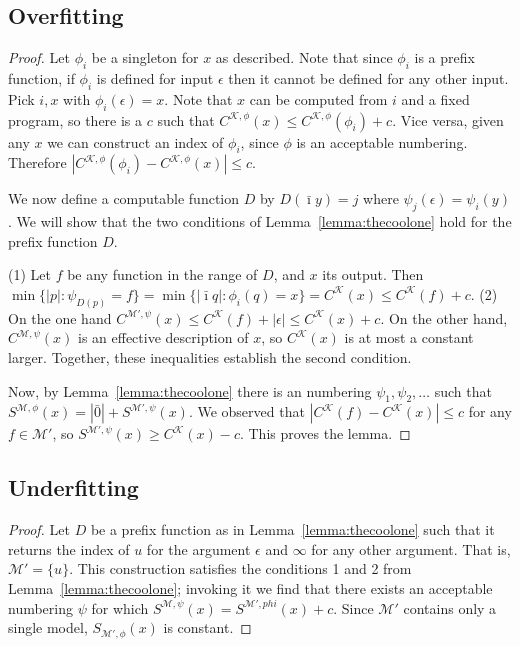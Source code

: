 \documentclass{style/llncs}
\newcommand{\M}{\mathscr M}
\newcommand{\K}{\mathscr K}
\newcommand{\s}{S}
\begin{document}
\subsection{Overfitting}

\overfitting*

\begin{proof}
Let $\phi_i$ be a singleton for $x$ as described. Note that since $\phi_i$ is a prefix function, if $\phi_i$ is defined for input $\epsilon$ then it cannot be defined for any other input. Pick $i,x$ with $\phi_i(\epsilon)=x$. Note that $x$ can be computed from $i$ and a fixed program, so there is a $c$ such that $C^{\K, \phi}(x)\le C^{\K, \phi}(\phi_i)+c$. Vice versa, given any $x$ we can construct an index of $\phi_i$, since $\phi$ is an acceptable numbering. Therefore $|C^{\K,\phi}(\phi_i)-C^{\K, \phi}(x)|\le c$.

We now define a computable function $D$ by $D(\bar\imath y)=j$ where $\psi_j(\epsilon) = \psi_i(y)$.  We will show that the two conditions of Lemma~\ref{lemma:thecoolone} hold for the prefix function $D$.

(1) Let $f$ be any function in the range of $D$, and $x$ its output. Then $\min\{|p|:\psi_{D(p)}=f\}=\min\{|\bar\imath q|:\phi_i(q)=x\}=C^{\K}(x) \le C^{\K}(f)+c$. (2) On the one hand $C^{\M',\psi}(x)\le C^\K(f)+|\epsilon|\le C^\K(x)+c$. On the other hand, $C^{\M,\psi}(x)$ is an effective description of $x$, so $C^{\K}(x)$ is at most a constant larger. Together, these inequalities establish the second condition.

Now, by Lemma~\ref{lemma:thecoolone} there is an numbering $\psi_1,\psi_2,\ldots$ such that $\s^{\M,\phi}(x)=|\bar 0|+S^{\M',\psi}(x)$. We observed that $|C^{\K}(f)-C^{\K}(x)|\le c$ for any $f\in\M'$, so $\s^{\M',\psi}(x)\ge C^{\K}(x)-c$. This proves the lemma.
\end{proof}
\subsection{Underfitting}

\underfitting*

\begin{proof}
Let $D$ be a prefix function as in Lemma~\ref{lemma:thecoolone} such that it returns the index of $u$ for the argument $\epsilon$ and $\infty$ for any other argument. That is, $\M' = \{u\}$. This construction satisfies the conditions 1 and 2 from Lemma~\ref{lemma:thecoolone}; invoking it we find that there exists an acceptable numbering $\psi$ for which $\s^{\M,\psi}(x) = \s^{\M', phi}(x) + c$. Since $\M'$ contains only a single model, $\s_{\M',\phi}(x)$ is constant.
\end{proof}
\end{document}
